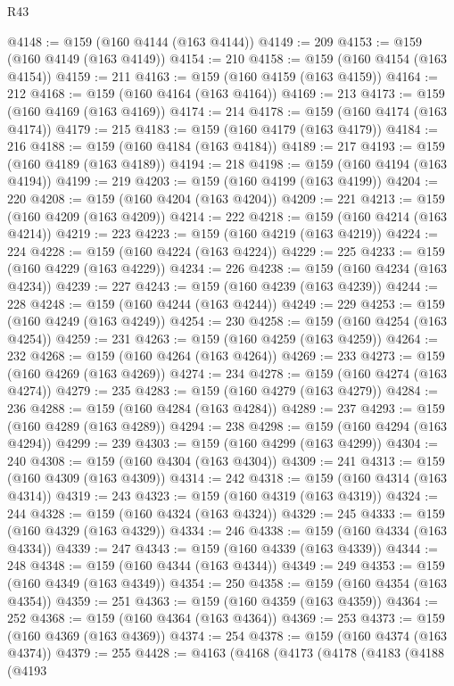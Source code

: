 \begin{lexlean}{R43}
\begin{coremodule}
@4148 := @159 (@160 @4144 (@163 @4144))
@4149 := 209
@4153 := @159 (@160 @4149 (@163 @4149))
@4154 := 210
@4158 := @159 (@160 @4154 (@163 @4154))
@4159 := 211
@4163 := @159 (@160 @4159 (@163 @4159))
@4164 := 212
@4168 := @159 (@160 @4164 (@163 @4164))
@4169 := 213
@4173 := @159 (@160 @4169 (@163 @4169))
@4174 := 214
@4178 := @159 (@160 @4174 (@163 @4174))
@4179 := 215
@4183 := @159 (@160 @4179 (@163 @4179))
@4184 := 216
@4188 := @159 (@160 @4184 (@163 @4184))
@4189 := 217
@4193 := @159 (@160 @4189 (@163 @4189))
@4194 := 218
@4198 := @159 (@160 @4194 (@163 @4194))
@4199 := 219
@4203 := @159 (@160 @4199 (@163 @4199))
@4204 := 220
@4208 := @159 (@160 @4204 (@163 @4204))
@4209 := 221
@4213 := @159 (@160 @4209 (@163 @4209))
@4214 := 222
@4218 := @159 (@160 @4214 (@163 @4214))
@4219 := 223
@4223 := @159 (@160 @4219 (@163 @4219))
@4224 := 224
@4228 := @159 (@160 @4224 (@163 @4224))
@4229 := 225
@4233 := @159 (@160 @4229 (@163 @4229))
@4234 := 226
@4238 := @159 (@160 @4234 (@163 @4234))
@4239 := 227
@4243 := @159 (@160 @4239 (@163 @4239))
@4244 := 228
@4248 := @159 (@160 @4244 (@163 @4244))
@4249 := 229
@4253 := @159 (@160 @4249 (@163 @4249))
@4254 := 230
@4258 := @159 (@160 @4254 (@163 @4254))
@4259 := 231
@4263 := @159 (@160 @4259 (@163 @4259))
@4264 := 232
@4268 := @159 (@160 @4264 (@163 @4264))
@4269 := 233
@4273 := @159 (@160 @4269 (@163 @4269))
@4274 := 234
@4278 := @159 (@160 @4274 (@163 @4274))
@4279 := 235
@4283 := @159 (@160 @4279 (@163 @4279))
@4284 := 236
@4288 := @159 (@160 @4284 (@163 @4284))
@4289 := 237
@4293 := @159 (@160 @4289 (@163 @4289))
@4294 := 238
@4298 := @159 (@160 @4294 (@163 @4294))
@4299 := 239
@4303 := @159 (@160 @4299 (@163 @4299))
@4304 := 240
@4308 := @159 (@160 @4304 (@163 @4304))
@4309 := 241
@4313 := @159 (@160 @4309 (@163 @4309))
@4314 := 242
@4318 := @159 (@160 @4314 (@163 @4314))
@4319 := 243
@4323 := @159 (@160 @4319 (@163 @4319))
@4324 := 244
@4328 := @159 (@160 @4324 (@163 @4324))
@4329 := 245
@4333 := @159 (@160 @4329 (@163 @4329))
@4334 := 246
@4338 := @159 (@160 @4334 (@163 @4334))
@4339 := 247
@4343 := @159 (@160 @4339 (@163 @4339))
@4344 := 248
@4348 := @159 (@160 @4344 (@163 @4344))
@4349 := 249
@4353 := @159 (@160 @4349 (@163 @4349))
@4354 := 250
@4358 := @159 (@160 @4354 (@163 @4354))
@4359 := 251
@4363 := @159 (@160 @4359 (@163 @4359))
@4364 := 252
@4368 := @159 (@160 @4364 (@163 @4364))
@4369 := 253
@4373 := @159 (@160 @4369 (@163 @4369))
@4374 := 254
@4378 := @159 (@160 @4374 (@163 @4374))
@4379 := 255
@4428 := @4163
    (@4168
      (@4173
        (@4178
          (@4183
            (@4188
              (@4193

\end{coremodule}
\end{lexlean}
